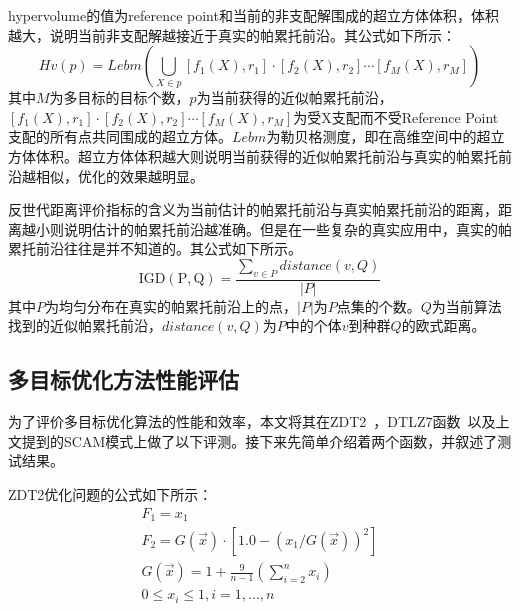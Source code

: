 hypervolume的值为reference point和当前的非支配解围成的超立方体体积，体积越大，说明当前非支配解越接近于真实的帕累托前沿。其公式如下所示：
\begin{equation}
\label{equ:Rasfuc}
H v ( p ) = L e b m \left( \bigcup _ { X \in p } \left[ f _ { 1 } ( X ) , r _ { 1 } \right] \cdot \left[ f _ { 2 } ( X ) , r _ { 2 } \right]  \cdots  \left[ f _ { M } ( X ) , r _ { M } \right] \right)
\end{equation}
其中$M$为多目标的目标个数，$p$为当前获得的近似帕累托前沿，$\left[ f _ { 1 } ( X ) , r _ { 1 } \right] \cdot \left[ f _ { 2 } ( X ) , r _ { 2 } \right]  \cdots  \left[ f _ { M } ( X ) , r _ { M } \right]$为受X支配而不受Reference Point支配的所有点共同围成的超立方体。$Lebm$为勒贝格测度，即在高维空间中的超立方体体积。超立方体体积越大则说明当前获得的近似帕累托前沿与真实的帕累托前沿越相似，优化的效果越明显。

反世代距离评价指标的含义为当前估计的帕累托前沿与真实帕累托前沿的距离，距离越小则说明估计的帕累托前沿越准确。但是在一些复杂的真实应用中，真实的帕累托前沿往往是并不知道的。其公式如下所示。
\begin{equation}
\label{equ:Rasfuc}
\mathrm { IGD ( P , Q ) } = \frac { \sum _ { v \in P } distance ( v , Q ) } { \left| P \right| }
\end{equation}
其中$P$为均匀分布在真实的帕累托前沿上的点，$\left| P \right|$为$P$点集的个数。$Q$为当前算法找到的近似帕累托前沿，$distance ( v , Q )$为$P$中的个体$v$到种群$Q$的欧式距离。

\subsection{多目标优化方法性能评估}
为了评价多目标优化算法的性能和效率，本文将其在ZDT2~\cite{zitzler2000comparison}，DTLZ7函数~\cite{deb2002scalable}以及上文提到的SCAM模式上做了以下评测。接下来先简单介绍着两个函数，并叙述了测试结果。

ZDT2优化问题的公式如下所示：
\begin{equation}
\begin{array} { l } { F _ { 1 } = x _ { 1 } } \\ { F _ { 2 } = G ( \vec { x } ) \cdot \left[ 1.0 - \left( x _ { 1 } / G ( \vec { x } ) \right) ^ { 2 } \right] } \\ { G ( \vec { x } ) = 1 + \frac { 9 } { n - 1 } \left( \sum _ { i = 2 } ^ { n } x _ { i } \right) } \\ { 0 \leq x _ { i } \leq 1 , i = 1 , \ldots , n } \end{array}    
\end{equation}

